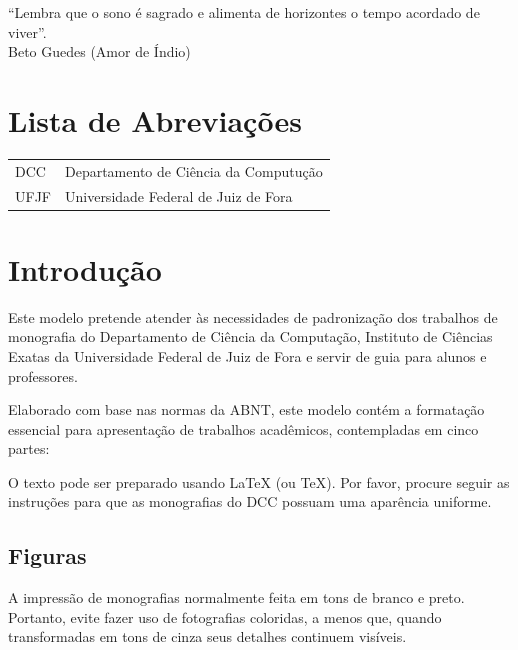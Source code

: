 \documentclass[a4paper,12pt]{monografia}
\theoremstyle{plain}
\theoremstyle{definition}
\theoremstyle{remark}
\begin{document}
\begin{epigrafe}
``Lembra que o sono \'e sagrado e alimenta de horizontes o tempo acordado de viver''.\\
\hfill Beto Guedes (Amor de Índio)
\end{epigrafe}



 \tableofcontents \thispagestyle{empty} \listoffigures
\thispagestyle{empty} \listoftables \thispagestyle{empty}



\chapter*{Lista de Abrevia\c{c}\~oes} 
\doublespacing  \begin{tabular}{l l}

DCC & Departamento de Ci\^encia da Computu\c{c}\~ao \\
UFJF & Universidade Federal de Juiz de Fora \\



\end{tabular}  \thispagestyle{empty}




%
%
%
\pagestyle{ruledheader}
\chapter{Introdu\c{c}\~ao}
Este modelo pretende atender \`as necessidades de padroniza\c{c}\~ao dos trabalhos de monografia do Departamento de Ci\^encia da Computa\c{c}\~ao, Instituto de Ci\^encias Exatas da Universidade Federal de Juiz de Fora e servir de guia para alunos e professores.
 
Elaborado com base nas normas da ABNT, este modelo cont\'em a formata\c{c}\~ao essencial para apresenta\c{c}\~ao de trabalhos acad\^emicos, contempladas em  cinco partes:

O texto pode ser preparado usando LaTeX (ou TeX). Por favor, procure seguir as instru\c{c}\~oes para que as monografias do DCC possuam uma apar\^encia uniforme.

\section{Figuras}
A impress\~ao de monografias normalmente feita em tons de branco e preto. Portanto, evite fazer uso de fotografias coloridas, a menos que, quando transformadas em tons de cinza seus detalhes continuem vis\'iveis.
\end{document}
